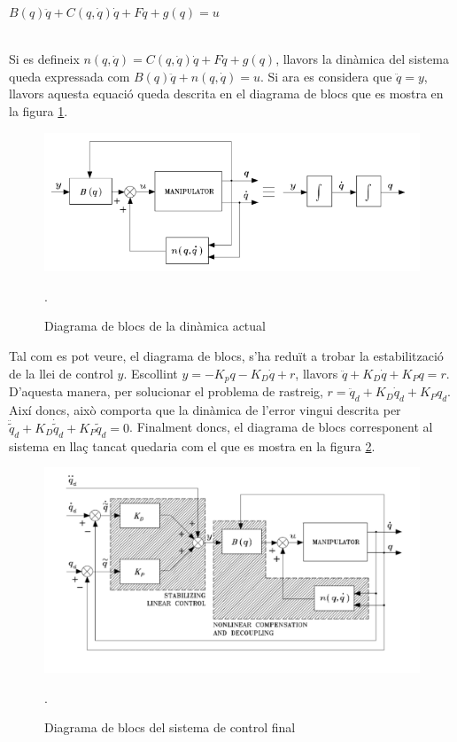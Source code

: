 \documentclass[]{article}
\begin{document}
\centerline{$B(q)\ddot{q} + C(q, \dot{q})\dot{q} + F\dot{q} + g(q) = u$} \leavevmode \\

Si es defineix $n(q, \dot{q}) = C(q, \dot{q})\dot{q} + F\dot{q} + g(q)$, llavors la dinàmica del sistema queda expressada com $B(q)\ddot{q} + n(q, \dot{q}) = u$. Si ara es considera que $\ddot{q} = y$, llavors aquesta equació queda descrita en el diagrama de blocs que es mostra en la figura \ref{fig:inv_dyn_plant_bloc}. 

\begin{figure}[H]
\centering
    \includegraphics[width = 0.7\linewidth]{images/Inv_Dyn_Plant_Bloc.png}
    \caption{Diagrama de blocs de la dinàmica actual}.
    \label{fig:inv_dyn_plant_bloc}
\end{figure}

Tal com es pot veure, el diagrama de blocs, s'ha reduït a trobar la estabilització de la llei de control $y$. Escollint $y = -K_{p}q -K_{D}\dot{q} + r$, llavors $\ddot{q} + K_{D}\dot{q} + K_{P}q = r$. D'aquesta manera, per solucionar el problema de rastreig, $r = \ddot{q}_{d} + K_{D}\dot{q}_{d} + K_{P}q_{d}$. Així doncs, això comporta que la dinàmica de l'error vingui descrita per  $\ddot{\tilde{q}}_{d} + K_{D}\dot{\tilde{q}}_{d} + K_{P}\tilde{q}_{d} = 0$. Finalment doncs, el diagrama de blocs corresponent al sistema en llaç tancat quedaria com el que es mostra en la figura \ref{fig:inv_dyn_complete_bloc}.

\begin{figure}[H]
\centering
    \includegraphics[width = 0.7\linewidth]{images/Inverse_Dynamics_Block_Diagram.png}
    \caption{Diagrama de blocs del sistema de control final}.
    \label{fig:inv_dyn_complete_bloc}
\end{figure}
\end{document}
